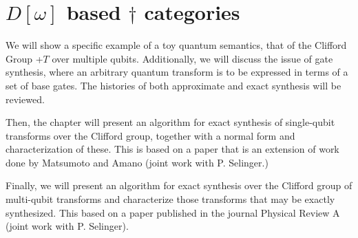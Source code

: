 \section*{$D[\omega]$ based $\dagger$ categories}

We will show a specific example of a toy quantum semantics, that of the Clifford Group +$T$ over
multiple qubits. Additionally, we will discuss the issue of gate synthesis, where an arbitrary
quantum transform is to be expressed in terms of a set of base gates. The histories of both
approximate and exact synthesis will be reviewed.

Then, the chapter will present an algorithm for exact synthesis of single-qubit transforms over the
Clifford group, together with a normal form and characterization of these. This is based on a paper
that is an extension of work done by Matsumoto and Amano (joint work with P. Selinger.)

Finally, we will present an algorithm for exact synthesis over the Clifford group of multi-qubit
transforms and characterize those transforms that may be exactly synthesized. This based on a paper
published in the journal Physical Review A (joint work with P. Selinger).

